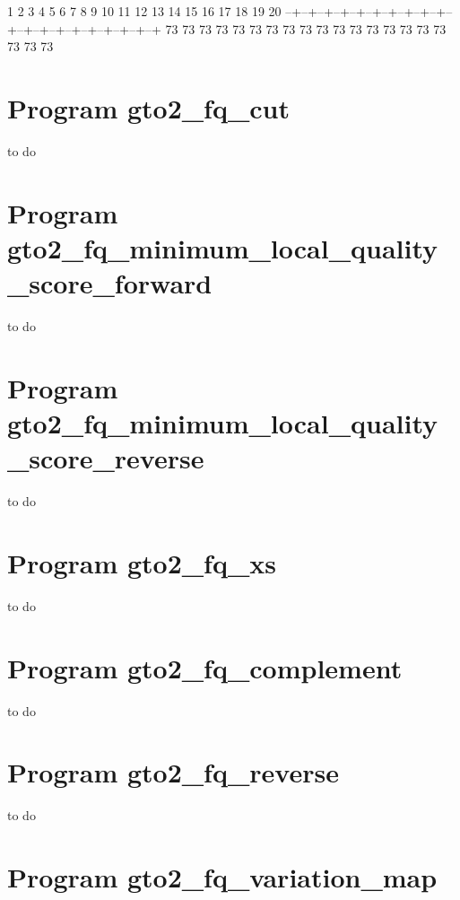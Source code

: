 \documentclass[11pt,]{krantz}
\newenvironment{Shaded}{\begin{snugshade}}{\end{snugshade}}
\newcommand{\ExtensionTok}[1]{#1}
\newcommand{\NormalTok}[1]{#1}
\begin{document}
\begin{Shaded}
\begin{Highlighting}[]
 \ExtensionTok{1}\NormalTok{  2  3  4  5  6  7  8  9 10 11 12 13 14 15 16 17 18 19 20 }
\ExtensionTok{--+--+--+--+--+--+--+--+--+--+--+--+--+--+--+--+--+--+--+--+}
\ExtensionTok{73}\NormalTok{ 73 73 73 73 73 73 73 73 73 73 73 73 73 73 73 73 73 73 73}
\end{Highlighting}
\end{Shaded}

\section{Program gto2\_fq\_cut}\label{program-gto2_fq_cut}

to do

\section{Program
gto2\_fq\_minimum\_local\_quality\_score\_forward}\label{program-gto2_fq_minimum_local_quality_score_forward}

to do

\section{Program
gto2\_fq\_minimum\_local\_quality\_score\_reverse}\label{program-gto2_fq_minimum_local_quality_score_reverse}

to do

\section{Program gto2\_fq\_xs}\label{program-gto2_fq_xs}

to do

\section{Program gto2\_fq\_complement}\label{program-gto2_fq_complement}

to do

\section{Program gto2\_fq\_reverse}\label{program-gto2_fq_reverse}

to do

\section{Program
gto2\_fq\_variation\_map}\label{program-gto2_fq_variation_map}
\end{document}
